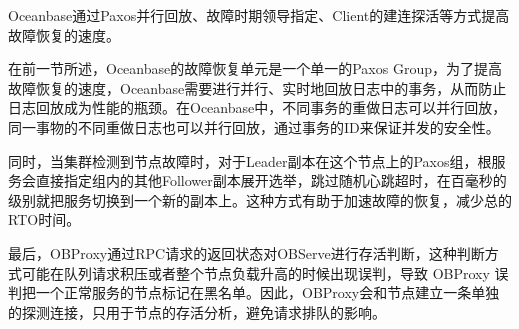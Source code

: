 Oceanbase通过Paxos并行回放、故障时期领导指定、Client的建连探活等方式提高故障恢复的速度。

在前一节所述，Oceanbase的故障恢复单元是一个单一的Paxos Group，为了提高故障恢复的速度，Oceanbase需要进行并行、实时地回放日志中的事务，从而防止日志回放成为性能的瓶颈。在Oceanbase中，不同事务的重做日志可以并行回放，同一事物的不同重做日志也可以并行回放，通过事务的ID来保证并发的安全性。

同时，当集群检测到节点故障时，对于Leader副本在这个节点上的Paxos组，根服务会直接指定组内的其他Follower副本展开选举，跳过随机心跳超时，在百毫秒的级别就把服务切换到一个新的副本上。这种方式有助于加速故障的恢复，减少总的RTO时间。

最后，OBProxy通过RPC请求的返回状态对OBServe进行存活判断，这种判断方式可能在队列请求积压或者整个节点负载升高的时候出现误判，导致 OBProxy 误判把一个正常服务的节点标记在黑名单。因此，OBProxy会和节点建立一条单独的探测连接，只用于节点的存活分析，避免请求排队的影响。
